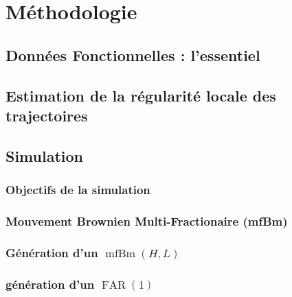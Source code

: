 \chapter{Méthodologie}
\minitoc%

\section{Données Fonctionnelles : l'essentiel}



\section{Estimation de la régularité locale des trajectoires}



% 
\section{Simulation}

\subsection{Objectifs de la simulation}



\subsection{Mouvement Brownien Multi-Fractionaire (mfBm)}



\subsection{Génération d'un $\operatorname{mfBm}(H, L)$}



\subsection{génération d'un $\operatorname{FAR}(1)$}


